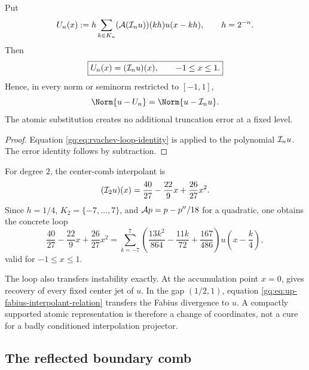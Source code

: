 \begin{theorem}
\label{gq:thm:finite-rvachev-loop}
Put
\begin{equation}
 U_n(x):=h\sum_{k\in K_n}
   (\mathcal A(\mathcal I_nu))(kh)u(x-kh),
 \qquad h=2^{-n}.
 \label{gq:eq:rvachev-loop-definition}
\end{equation}
Then
\begin{equation}
 \boxed{U_n(x)=(\mathcal I_nu)(x),\qquad -1\le x\le1.}
 \label{gq:eq:rvachev-loop-identity}
\end{equation}
Hence, in every norm or seminorm restricted to $[-1,1]$,
\begin{equation}
 \Norm{u-U_n}=\Norm{u-\Interp_nu}.
 \label{gq:eq:rvachev-loop-error-transfer}
\end{equation}
The atomic substitution creates no additional truncation error at a fixed
level.
\end{theorem}

\begin{proof}
Equation \eqref{gq:eq:rvachev-loop-identity} is
 applied to the polynomial
$\mathcal I_nu$.  The error identity follows by subtraction.
\end{proof}

For degree $2$, the center-comb interpolant is
\begin{equation}
 (\mathcal I_2u)(x)=\frac{40}{27}-\frac{22}{9}x+\frac{26}{27}x^2.
 \label{gq:eq:up-degree-two-interpolant}
\end{equation}
Since $h=1/4$, $K_2=\{-7,\ldots,7\}$, and
$\mathcal A p=p-p''/18$ for a quadratic, one obtains the concrete loop
\begin{equation}
 \boxed{
 \frac{40}{27}-\frac{22}{9}x+\frac{26}{27}x^2
 =\sum_{k=-7}^{7}
 \left(\frac{13k^2}{864}-\frac{11k}{72}+\frac{167}{486}\right)
 u\!\left(x-\frac{k}{4}\right),}
 \label{gq:eq:up-degree-two-loop}
\end{equation}
valid for $-1\le x\le1$.

The loop also transfers instability exactly.  At the accumulation point
$x=0$,  gives recovery of every fixed center jet
of $u$.  In the gap $(1/2,1)$, equation
\eqref{gq:eq:up-fabius-interpolant-relation} transfers the Fabius divergence to
$u$.  A compactly supported atomic representation is therefore a change of
coordinates, not a cure for a badly conditioned interpolation projector.

\subsection{The reflected boundary comb}

